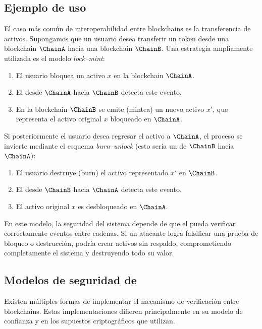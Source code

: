 \subsection{Ejemplo de uso}

El caso más común de interoperabilidad entre blockchains es la transferencia de activos. Supongamos que un usuario desea transferir un token desde una blockchain $\ChainA$ hacia una blockchain $\ChainB$. Una estrategia ampliamente utilizada es el modelo \emph{lock–mint}:

\begin{enumerate}[noitemsep]
	\item El usuario bloquea un activo $x$ en la blockchain $\ChainA$.
	\item El \Bridge desde $\ChainA$ hacia $\ChainB$ detecta este evento.
	\item En la blockchain $\ChainB$ se emite (mintea) un nuevo activo $x'$, que representa el activo original $x$ bloqueado en $\ChainA$.
\end{enumerate}

Si posteriormente el usuario desea regresar el activo a $\ChainA$, el proceso se invierte mediante el esquema \emph{burn–unlock} (esto sería un \Bridge de $\ChainB$ hacia $\ChainA$):

\begin{enumerate}[noitemsep]
	\item El usuario destruye (burn) el activo representado $x'$ en $\ChainB$.
	\item El \Bridge desde $\ChainB$ hacia $\ChainA$ detecta este evento.
	\item El activo original $x$ es desbloqueado en $\ChainA$.
\end{enumerate}

En este modelo, la seguridad del sistema depende de que el \Bridge pueda verificar correctamente eventos entre cadenas. Si un atacante logra falsificar una prueba de bloqueo o destrucción, podría crear activos sin respaldo, comprometiendo completamente el sistema y destruyendo todo su valor.

\subsection{Modelos de seguridad de \Bridges}

Existen múltiples formas de implementar el mecanismo de verificación entre blockchains. Estas implementaciones difieren principalmente en su modelo de confianza y en los supuestos criptográficos que utilizan.

